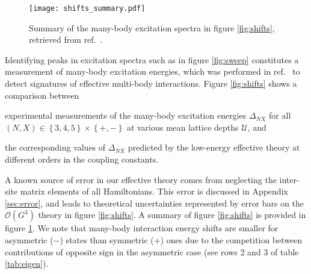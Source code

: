 \documentclass[preprint,showkeys,nofootinbib]{revtex4-1}
\newcommand{\p}[1]{\left(#1\right)} %
\renewcommand{\set}[1]{\left\{#1\right\}} %
\renewcommand{\O}{\mathcal{O}}
\newcommand{\U}{\mathcal{U}}
\newcommand{\1}{\mathds{1}}
\begin{document}
\begin{figure}
  \centering
  \texttt{[image: shifts\_summary.pdf]}
  \caption{\footnotesize Summary of the many-body excitation spectra
    in figure \ref{fig:shifts}, retrieved from
    ref.~\cite{goban2018emergence}.}
  \label{fig:shifts_summary}
\end{figure}

Identifying peaks in excitation spectra such as in figure
\ref{fig:sweep} constitutes a measurement of many-body excitation
energies, which was performed in ref.~\cite{goban2018emergence} to
detect signatures of effective multi-body interactions.  Figure
\ref{fig:shifts} shows a comparison between
\begin{enumerate*}
\item experimental measurements of the many-body excitation energies
  $\Delta_{NX}$ for all $\p{N,X}\in\set{3,4,5}\times\set{+,-}$ at
  various mean lattice depths $\U$, and
\item the corresponding values of $\Delta_{NX}$ predicted by the
  low-energy effective theory at different orders in the coupling
  constants.
\end{enumerate*}
A known source of error in our effective theory comes from neglecting
the inter-site matrix elements of all Hamiltonians.  This error is
discussed in Appendix \ref{sec:error}, and leads to theoretical
uncertainties represented by error bars on the $\O\p{G^3}$ theory in
figure \ref{fig:shifts}.  A summary of figure \ref{fig:shifts} is
provided in figure \ref{fig:shifts_summary}.  We note that many-body
interaction energy shifts are smaller for asymmetric ($-$) states than
symmetric ($+$) ones due to the competition between contributions of
opposite sign in the asymmetric case (see rows 2 and 3 of table
\ref{tab:eigen}).
\end{document}
